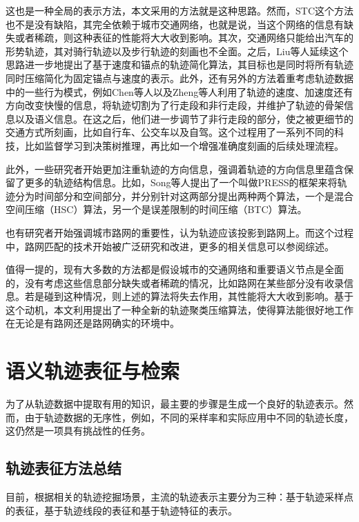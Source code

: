 这也是一种全局的表示方法，本文采用的方法就是这种思路。然而，STC这个方法也不是没有缺陷，其完全依赖于城市交通网络，也就是说，当这个网络的信息有缺失或者稀疏，则这种表征的性能将大大收到影响。其次，交通网络只能给出汽车的形势轨迹，其对骑行轨迹以及步行轨迹的刻画也不全面。之后，Liu等人延续这个思路进一步地提出了基于速度和锚点的轨迹简化算法，其目标也是同时将所有轨迹同时压缩简化为固定锚点与速度的表示。此外，还有另外的方法着重考虑轨迹数据中的一些行为模式，例如Chen等人以及Zheng等人利用了轨迹的速度、加速度还有方向改变快慢的信息，将轨迹切割为了行走段和非行走段，并维护了轨迹的骨架信息以及语义信息。在这之后，他们进一步调节了非行走段的部分，使之被更细节的交通方式所刻画，比如自行车、公交车以及自驾。这个过程用了一系列不同的科技，比如监督学习到决策树推理，再比如一个增强准确度刻画的后续处理流程。

此外，一些研究者开始更加注重轨迹的方向信息，强调着轨迹的方向信息里蕴含保留了更多的轨迹结构信息。比如，Song等人提出了一个叫做PRESS的框架来将轨迹分为时间部分和空间部分，并分别针对这两部分提出两种两个算法，一个是混合空间压缩（HSC）算法，另一个是误差限制的时间压缩（BTC）算法。

也有研究者开始强调城市路网的重要性，认为轨迹应该投影到路网上。而这个过程中，路网匹配的技术开始被广泛研究和改进，更多的相关信息可以参阅综述。

值得一提的，现有大多数的方法都是假设城市的交通网络和重要语义节点是全面的，没有考虑这些信息部分缺失或者稀疏的情况，比如路网在某些部分没有收录信息。若是碰到这种情况，则上述的算法将失去作用，其性能将大大收到影响。基于这个动机，本文利用提出了一种全新的轨迹聚类压缩算法，使得算法能很好地工作在无论是有路网还是路网确实的环境中。

\section{语义轨迹表征与检索}

为了从轨迹数据中提取有用的知识，最主要的步骤是生成一个良好的轨迹表示。然而，由于轨迹数据的无序性，例如，不同的采样率和实际应用中不同的轨迹长度，这仍然是一项具有挑战性的任务。

\subsection{轨迹表征方法总结}
目前，根据相关的轨迹挖掘场景，主流的轨迹表示主要分为三种：基于轨迹采样点的表征，基于轨迹线段的表征和基于轨迹特征的表示。

